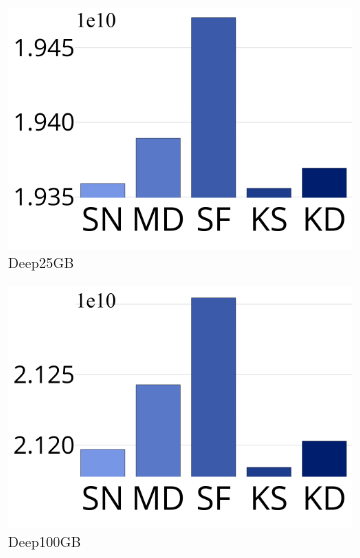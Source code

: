 \begin{figure}[htp]
\begin{subfigure}{0.018\columnwidth}
   \vspace{0.18in}
		\end{subfigure}	
		\begin{subfigure}{\sfig\columnwidth}
			\centering
			\captionsetup{justification=centering}	
			\includegraphics[width=\textwidth]{../img/Experiments/EP/DEEP_25GB_100.png}
		\caption{{Deep25GB}}
		\label{fig:ss:deep1b}
		\end{subfigure}	
		\begin{subfigure}{\sfig\columnwidth}
			\centering
			\captionsetup{justification=centering}	
			\includegraphics[width=\textwidth]{../img/Experiments/EP/DEEP_100GB_100.png}
		\caption{{Deep100GB}}
		\label{fig:ss:deep1b}
		\end{subfigure}		
		\begin{subfigure}{\sfig\columnwidth}

\end{subfigure}
\end{figure}
